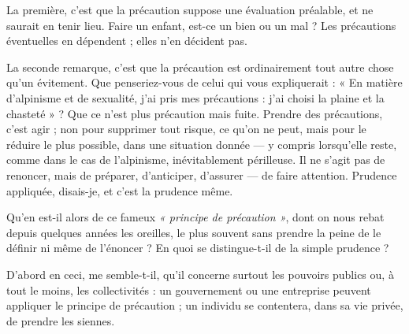 La première, c’est que la précaution suppose une évaluation préalable, et ne
saurait en tenir lieu. Faire un enfant, est-ce un bien ou un mal ? Les précautions
éventuelles en dépendent ; elles n’en décident pas.

La seconde remarque, c’est que la précaution est ordinairement tout autre
chose qu’un évitement. Que penseriez-vous de celui qui vous expliquerait :
« En matière d’alpinisme et de sexualité, j'ai pris mes précautions : j'ai choisi la
plaine et la chasteté » ? Que ce n’est plus précaution mais fuite. Prendre des
précautions, c’est agir ; non pour supprimer tout risque, ce qu’on ne peut, mais
pour le réduire le plus possible, dans une situation donnée — y compris
lorsqu'elle reste, comme dans le cas de l’alpinisme, inévitablement périlleuse. Il
ne s’agit pas de renoncer, mais de préparer, d’anticiper, d’assurer — de faire
attention. Prudence appliquée, disais-je, et c’est la prudence même.

Qu'en est-il alors de ce fameux {\it « principe de précaution »}, dont on nous
rebat depuis quelques années les oreilles, le plus souvent sans prendre la peine
de le définir ni même de l’énoncer ? En quoi se distingue-t-il de la simple
prudence ?

D'abord en ceci, me semble-t-il, qu’il concerne surtout les pouvoirs publics
ou, à tout le moins, les collectivités : un gouvernement ou une entreprise peuvent
appliquer le principe de précaution ; un individu se contentera, dans sa vie
privée, de prendre les siennes.

